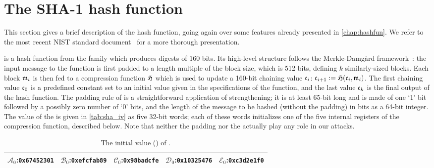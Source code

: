 \section{The SHA-1 hash function}
\label{sec:description}

This section gives a brief description of the \shaone hash function, going again over some features already presented in \autoref{chap:hashfun}. We refer to the most recent NIST standard document~\cite{Nist-SHA} for a more thorough
presentation.

\shaone is a hash function from the \mdsha family which produces digests of $160$ bits.
Its high-level structure follows the Merkle-Damg{\aa}rd framework~\cite{DBLP:conf/crypto/Merkle89a,DBLP:conf/crypto/Damgard89a}: the input message to the function
is first padded to a length multiple of the block size, which is 512 bits, defining $k$ similarly-sized blocks.
Each block $\mathfrak{m}_i$ is then fed to a compression function $\operatorname{\mathfrak{H}}$ which is used to update a 160-bit chaining value $\mathfrak{c}_i$:
$\mathfrak{c}_{i+1} := \operatorname{\mathfrak{H}}(\mathfrak{c}_i,\mathfrak{m}_{i})$.
The first chaining value $\mathfrak{c}_0$ is a predefined constant set to an initial value \iv given in the specifications of the function, and the last value $\mathfrak{c}_k$ is the final output of the hash function.
The padding rule of \shaone is a straightforward application of \merkdam strengthening; it is at least 65-bit long and is made of one `1' bit followed by a possibly zero
number of `0' bits, and the length of the message to be hashed (without the padding) in bits as a 64-bit integer. The value of the \iv is given in \autoref{tab:sha_iv} as five 32-bit words;
each of these words initializes one of the five internal registers of the compression function, described below.
Note that neither the padding nor the \iv actually play any role in our attacks.

\begin{table}[ht]
\caption{\label{tab:sha_iv}The initial value (\iv) of \shaone.}
\begin{center}
\begin{tabular}{c c c c c} \toprule
$\mathcal{A}_0$:\texttt{0x67452301} & $\mathcal{B}_0$:\texttt{0xefcfab89} & $\mathcal{C}_0$:\texttt{0x98badcfe} & $\mathcal{D}_0$:\texttt{0x10325476} & $\mathcal{E}_0$:\texttt{0xc3d2e1f0} \\ 
\bottomrule
\end{tabular}
\end{center}
\end{table}

